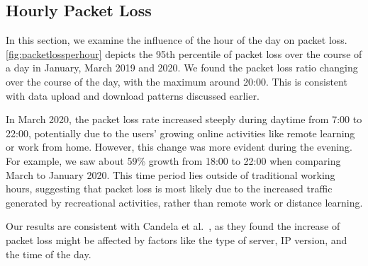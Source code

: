 
\subsection{Hourly Packet Loss}

In this section, we examine the influence of the hour of the day on packet loss. \cref{fig:packetlossperhour} depicts the 95th percentile of packet loss over the course of a day in January, March 2019 and 2020. We found the packet loss ratio changing over the course of the day, with the maximum around 20:00. This is consistent with data upload and download patterns discussed earlier.

In March 2020, the packet loss rate increased steeply during daytime from 7:00 to 22:00, potentially due to the users' growing online activities like remote learning or work from home. However, this change was more evident during the evening. For example, we saw about 59\% growth from 18:00 to 22:00 when comparing March to January 2020. This time period lies outside of traditional working hours, suggesting that packet loss is most likely due to the increased traffic generated by recreational activities, rather than remote work or distance learning.

Our results are consistent with Candela et al.~\cite{Candela2020latency}, as they found the increase of packet loss might be affected by factors like the type of server, \gls{IP} version, and the time of the day.

